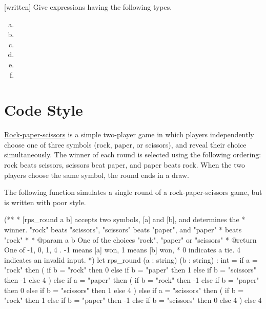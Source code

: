 \documentclass{pset}
\begin{document}
\exercise{}
[written] Give expressions having the following types.
\begin{multicols}{2}
\begin{enumerate}[(a)]
\item{} 
\item{} 
\item{} 
\columnbreak{}
\item{} 
\item{} 
\item{} 
\end{enumerate}
\end{multicols}

\newpage{}
\section*{Code Style}

\exercise{}
\href{http://en.wikipedia.org/wiki/Rock-paper-scissors}{Rock-paper-scissors}
is a simple two-player game in which players independently choose one
of three symbols (rock, paper, or scissors), and reveal their choice
simultaneously. The winner of each round is selected using the
following ordering: rock beats scissors, scissors beat paper, and
paper beats rock. When the two players choose the same symbol, the
round ends in a draw.

The following function simulates a single round of a
rock-paper-scissors game, but is written with poor style.

\begin{ocaml}
(** 
 * [rps_round a b] accepts two symbols, [a] and [b], and determines the
 * winner.  "rock" beats "scissors", "scissors" beats "paper", and "paper"
 * beats "rock"
 *
 * @param a b One of the choices "rock", "paper" or "scissors"
 * @return One of { -1, 0, 1, 4 }. -1 means [a] won, 1 means [b] won, 
 *   0 indicates a tie.  4 indicates an invalid input.
 *)
let rps_round (a : string) (b : string) : int =
  if a = "rock" then (
    if b = "rock" then 0
    else if b = "paper" then 1
    else if b = "scissors" then -1
    else 4
  )
  else if a = "paper" then (
    if b = "rock" then -1
    else if b = "paper" then 0
    else if b = "scissors" then 1
    else 4
  )
  else if a = "scissors" then (
    if b = "rock" then 1
    else if b = "paper" then -1
    else if b = "scissors" then 0
    else 4
  )
  else 4
\end{ocaml}
\end{document}
